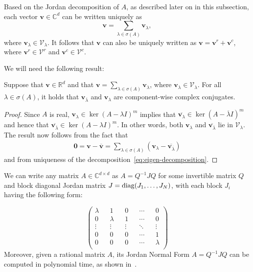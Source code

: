 \documentclass[format=acmsmall, review=false, screen=true]{acmart}
\DeclarePairedDelimiter{\diagfences}{(}{)}
\newcommand{\diag}{\operatorname{diag}\diagfences}
\newcommand{\Complex}{\mathbb{C}}
\newcommand{\myvector}{\boldsymbol}
\begin{document}
Based on the Jordan decomposition of $A$, as described later on in this 
subsection, each vector $\myvector{v}\in\Complex^{d}$
can be written uniquely as
\begin{equation}
\label{eq:eigen-decomposition}
\myvector{v}=\displaystyle{
  \sum\limits_{\lambda\in\sigma(A)}\myvector{v}_{\lambda}},
\end{equation}
where $\myvector{v}_{\lambda}\in\mathcal{V}_{\lambda}$.
It follows that $\myvector{v}$ can also be uniquely written as
$\myvector{v}=\myvector{v}^{r}+\myvector{v}^{c}$, where
$\myvector{v}^{r} \in\mathcal{V}^{r}$ and
$\myvector{v}^{c} \in\mathcal{V}^{c}$.

We will need the following result:
\begin{proposition}
\label{conj-relation}
  Suppose that $\myvector{v}\in\mathbb{R}^{d}$ and that $\myvector{v}=\sum\limits_{\lambda\in\sigma(A)} \myvector{v}_{\lambda}$, where $\myvector{v}_{\lambda} \in\mathcal{V}_{\lambda}$. For all $\lambda \in \sigma(A)$, it holds that $\myvector{v}_{\overline{\lambda}}$ and $\myvector{v}_{\lambda}$ are component-wise complex conjugates.
\end{proposition}

\begin{proof}
Since $A$ is real, $\myvector{v}_{\lambda}\in \ker{(A-\lambda I)}^{m}$
  implies that
  $\overline{\myvector{v}_{\lambda}} \in \ker{(A-\overline{\lambda}
  I)}^{m}$
  and hence that
  $\overline{ \myvector{v}_{ \overline{\lambda}}} \in
\ker{(A-\lambda I)}^{m}$.  In other words, both $\myvector{v}_{\lambda}$ and
$\overline{ \myvector{v}_{ \overline{\lambda}}}$ lie in
$\mathcal{V}_{\lambda}$.  The result now follows from the fact that
\begin{align*}
\myvector{0}=\myvector{v}-\overline{\myvector{v}}=\sum\limits_{\lambda\in \sigma(A)}(\myvector{v}_{\lambda}-\overline{ \myvector{v}_{ \overline{\lambda}}})
\end{align*}
and from uniqueness of the
decomposition~\eqref{eq:eigen-decomposition}.
\end{proof}

We can write any matrix $A \in \Complex^{d \times d}$ as $A=Q^{-1}JQ$ for some
invertible matrix $Q$ and block diagonal Jordan matrix
$J=\diag{J_{1},\ldots,J_{N}}$, with each block $J_{i}$ having the
following form:

\begin{equation*}
\begin{pmatrix}
\lambda	&&	1		&&	0		&&	\cdots	&&	0		\\
0		&&	\lambda	&&	1		&&	\cdots	&&	0		\\
\vdots	&&	\vdots	&&	\vdots	&&	\ddots	&&	\vdots	\\
0		&&	0		&&	0		&&	\cdots	&&	1		\\
0		&&	0		&&	0		&&	\cdots	&&	\lambda	\\
\end{pmatrix}
\end{equation*}
Moreover, given a rational matrix $A$, its Jordan Normal Form $A=Q^{-1}JQ$ can be
computed in polynomial time, as shown in~\cite{Cai94}.
\end{document}
